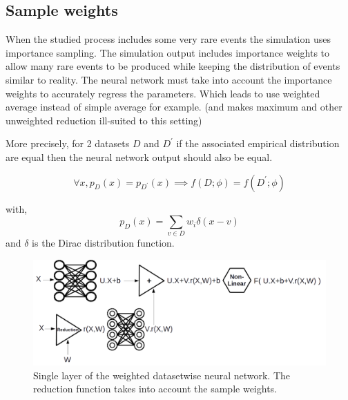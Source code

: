 







\subsection{Sample weights} %
\label{sub:sample_weights}


When the studied process includes some very rare events the simulation uses importance sampling. 
The simulation output includes importance weights to allow many rare events to be produced while keeping the distribution of events similar to reality.
The neural network must take into account the importance weights to accurately regress the parameters.
Which leads to use weighted average instead of simple average for example. (and makes maximum and other unweighted reduction ill-suited to this setting)

More precisely, for 2 datasets $D$ and $D^\prime$ if the associated empirical distribution are equal then the neural network output should also be equal.

\begin{equation}
    \forall x, p_D(x) = p_{D^\prime}(x) \implies f(D; \phi) = f(D^\prime; \phi)
\end{equation}

with,
\begin{equation}
    p_D(x) = \sum_{v \in D} w_i \delta (x - v)
\end{equation}
and $\delta$ is the Dirac distribution function.




\begin{figure}[htb]
    \includegraphics[width=\linewidth]{weighted_average_layer}
    \caption{Single layer of the weighted datasetwise neural network. The reduction function takes into account the sample weights.}
    \label{fig:weighted_average_layer}
\end{figure}


